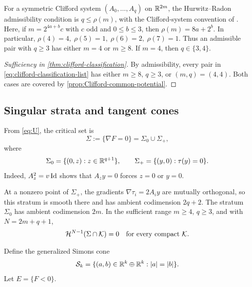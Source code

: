 For a symmetric Clifford system $(A_0,\ldots,A_q)$ on $\mathbb R^{2m}$,
the Hurwitz--Radon admissibility condition
\cite[Chapter~0, pp.~3--4]{Shapiro2000} is \(q\leq\rho(m)\),
with the Clifford-system convention of \cite{FKM81,TkachevClifford10}.
Here, if $m=2^{4a+b}c$ with $c$ odd and $0\leq b\leq3$, then \(\rho(m)=8a+2^b\).
In particular, \(\rho(4)=4,\; \rho(5)=1,\; \rho(6)=2,\; \rho(7)=1\).
Thus an admissible pair with $q\geq3$ has either $m=4$ or $m\geq8$.
If $m=4$, then $q\in\{3,4\}$.

\begin{proof}[Sufficiency in \cref{thm:clifford-classification}]
By admissibility, every pair in
\eqref{eq:clifford-classification-list} has either \(m\geq8\),
\(q\geq3\), or \((m,q)=(4,4)\). Both cases are covered by
\cref{prop:Clifford-common-potential}.
\end{proof}

\subsection{Singular strata and tangent cones}
\label{sec:tangents}

From \eqref{eq:U}, the critical set is
\[
 \Sigma:=\{\nabla F=0\}
 =\Sigma_0\cup\Sigma_+,
\]
where
\[
 \Sigma_0=\{(0,z):z\in\mathbb R^{q+1}\},\qquad
 \Sigma_+=\{(y,0):\tau(y)=0\}.
\]
Indeed, $A_z^2=v\operatorname{Id}$ shows that $A_zy=0$ forces $z=0$ or $y=0$.

At a nonzero point of $\Sigma_+$, the gradients
$\nabla\tau_i=2A_i y$ are mutually orthogonal, so this stratum is
smooth there and has ambient codimension $2q+2$.  The stratum
$\Sigma_0$ has ambient codimension $2m$.  In the sufficient range
$m\geq4$, $q\geq3$, and with $N=2m+q+1$,
\begin{equation}\label{eq:Sigma-thin}
 \mathcal H^{N-1}(\Sigma\cap \mathcal K)=0
 \quad\text{for every compact }\mathcal K.
\end{equation}

Define the generalized Simons cone
\[
 \mathcal S_k
 =\{(a,b)\in\mathbb R^k\oplus\mathbb R^k:|a|=|b|\}.
\]
Let $E=\{F<0\}$.

